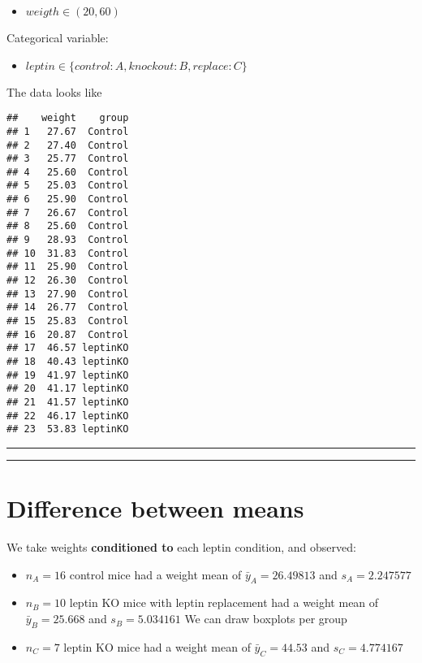 \documentclass[
]{book}
\providecommand{\tightlist}{%
  \setlength{\itemsep}{0pt}\setlength{\parskip}{0pt}}
\begin{document}
\begin{itemize}
\tightlist
\item
  \(weigth \in (20, 60)\)
\end{itemize}

Categorical variable:

\begin{itemize}
\tightlist
\item
  \(leptin \in \{control:A,knockout:B, replace:C\}\)
\end{itemize}

The data looks like

\begin{verbatim}
##    weight    group
## 1   27.67  Control
## 2   27.40  Control
## 3   25.77  Control
## 4   25.60  Control
## 5   25.03  Control
## 6   25.90  Control
## 7   26.67  Control
## 8   25.60  Control
## 9   28.93  Control
## 10  31.83  Control
## 11  25.90  Control
## 12  26.30  Control
## 13  27.90  Control
## 14  26.77  Control
## 15  25.83  Control
## 16  20.87  Control
## 17  46.57 leptinKO
## 18  40.43 leptinKO
## 19  41.97 leptinKO
## 20  41.17 leptinKO
## 21  41.57 leptinKO
## 22  46.17 leptinKO
## 23  53.83 leptinKO
\end{verbatim}

\begin{center}\rule{0.5\linewidth}{0.5pt}\end{center}

\begin{center}\rule{0.5\linewidth}{0.5pt}\end{center}

\hypertarget{difference-between-means-9}{%
\section{Difference between means}\label{difference-between-means-9}}

We take weights \textbf{conditioned to} each leptin condition, and observed:

\begin{itemize}
\item
  \(n_A=16\) control mice had a weight mean of \(\bar{y}_A=26.49813\) and \(s_A=2.247577\)
\item
  \(n_B=10\) leptin KO mice with leptin replacement had a weight mean of \(\bar{y}_B=25.668\) and \(s_B=5.034161\)
  We can draw boxplots per group
\item
  \(n_C=7\) leptin KO mice had a weight mean of \(\bar{y}_C=44.53\) and \(s_C=4.774167\)
\end{itemize}
\end{document}
